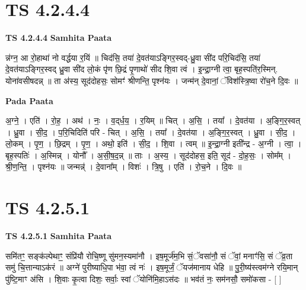 \documentclass[17pt]{extarticle}
\begin{document}
\section*{ TS 4.2.4.4 }

\textbf{TS 4.2.4.4 } \newline
\textbf{Samhita Paata} \newline

न्न॑ग्न॒ आ रो॒हाथा॑ नो वर्द्धया र॒यिं ॥ चिद॑सि॒ तया॑ दे॒वत॑याऽङ्गिर॒स्वद्-ध्रु॒वा सी॑द परि॒चिद॑सि॒ तया॑ दे॒वत॑याऽङ्गिर॒स्वद् ध्रु॒वा सी॑द लो॒कं पृ॑ण छि॒द्रं पृ॒णाथो॑ सीद शि॒वा त्वं । इ॒न्द्रा॒ग्नी त्वा॒ बृह॒स्पति॑र॒स्मिन्. योना॑वसीषदन्न् ॥ ता अ॑स्य॒ सूद॑दोहसः॒ सोमꣳ॑ श्रीणन्ति॒ पृश्न॑यः । जन्म॑न् दे॒वानां॒ ॅविश॑स्त्रि॒ष्वा रो॑च॒ने दि॒वः ॥ \newline

\textbf{Pada Paata} \newline

अ॒ग्ने॒ । एति॑ । रो॒ह॒ । अथ॑ । नः॒ । व॒द्‌र्ध॒य॒ । र॒यिम् ॥ चित् । अ॒सि॒ । तया᳚ । दे॒वत॑या । अ॒ङ्गि॒र॒स्वत् । ध्रु॒वा । सी॒द॒ । प॒रि॒चिदिति॑ परि - चित् । अ॒सि॒ । तया᳚ । दे॒वत॑या । अ॒ङ्गि॒र॒स्वत् । ध्रु॒वा । सी॒द॒ । लो॒कम् । पृ॒ण॒ । छि॒द्रम् । पृ॒ण॒ । अथो॒ इति॑ । सी॒द॒ । शि॒वा । त्वम् ॥ इ॒न्द्रा॒ग्नी इती᳚न्द्र - अ॒ग्नी । त्वा॒ । बृह॒स्पतिः॑ । अ॒स्मिन्न् । योनौ᳚ । अ॒सी॒ष॒द॒न्न् ॥ ताः । अ॒स्य॒ । सूद॑दोहस॒ इति॒ सूद॑ - दो॒ह॒सः॒ । सोम᳚म् । श्री॒ण॒न्ति॒ । पृश्न॑यः ॥ जन्मन्न्॑ । दे॒वाना᳚म् । विशः॑ । त्रि॒षु । एति॑ । रो॒च॒ने । दि॒वः ॥  \newline




\section*{ TS 4.2.5.1 }

\textbf{TS 4.2.5.1 } \newline
\textbf{Samhita Paata} \newline

समि॑तꣳ॒॒ सङ्क॑ल्पेथाꣳ॒॒ संप्रि॑यौ रोचि॒ष्णू सु॑मन॒स्यमा॑नौ । इष॒मूर्ज॑म॒भि सं॒ॅवसा॑नौ॒ सं ॅवां॒ मनाꣳ॑सि॒ सं ॅव्र॒ता समु॑ चि॒त्तान्याऽक॑रं ॥ अग्ने॑ पुरीष्याधि॒पा भ॑वा॒ त्वं नः॑ । इष॒मूर्जं॒ ॅयज॑मानाय धेहि ॥ पु॒री॒ष्य॑स्त्वम॑ग्ने रयि॒मान् पु॑ष्टि॒माꣳ अ॑सि । शि॒वाः कृ॒त्वा दिशः॒ सर्वाः॒ स्वां ॅयोनि॑मि॒हाऽस॑दः ॥ भव॑तं नः॒ सम॑नसौ॒ समो॑कसा - [  ] \newline
\end{document}
